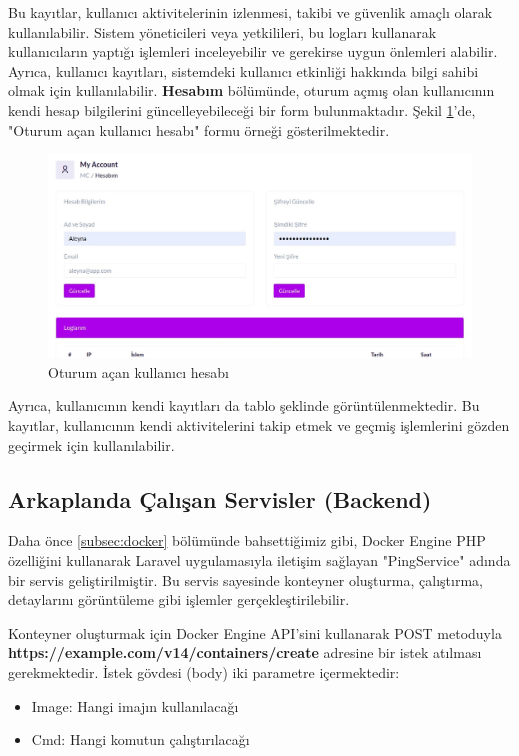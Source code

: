 Bu kayıtlar, kullanıcı aktivitelerinin izlenmesi, takibi ve güvenlik amaçlı olarak kullanılabilir. Sistem yöneticileri veya yetkilileri, bu logları kullanarak kullanıcıların yaptığı işlemleri inceleyebilir ve gerekirse uygun önlemleri alabilir. Ayrıca, kullanıcı kayıtları, sistemdeki kullanıcı etkinliği hakkında bilgi sahibi olmak için kullanılabilir.
\textbf{Hesabım} bölümünde, oturum açmış olan kullanıcının kendi hesap bilgilerini güncelleyebileceği bir form bulunmaktadır. Şekil \ref{fig:account}'de, "Oturum açan kullanıcı hesabı" formu örneği gösterilmektedir.
\begin{figure}[ht]
	\centering
	\includegraphics[width=0.7\linewidth]{images/account.jpeg}
	\caption{Oturum açan kullanıcı hesabı}
	\label{fig:account}
\end{figure}

Ayrıca, kullanıcının kendi kayıtları da tablo şeklinde görüntülenmektedir. Bu kayıtlar, kullanıcının kendi aktivitelerini takip etmek ve geçmiş işlemlerini gözden geçirmek için kullanılabilir.

\subsection{Arkaplanda Çalışan Servisler (Backend)}

Daha önce \ref{subsec:docker} bölümünde bahsettiğimiz gibi, Docker Engine PHP özelliğini kullanarak Laravel uygulamasıyla iletişim sağlayan "PingService" adında bir servis geliştirilmiştir. Bu servis sayesinde konteyner oluşturma, çalıştırma, detaylarını görüntüleme gibi işlemler gerçekleştirilebilir.

Konteyner oluşturmak için Docker Engine API'sini kullanarak POST metoduyla \textbf{https://example.com/v14/containers/create}  adresine bir istek atılması gerekmektedir. İstek gövdesi (body) iki parametre içermektedir:
\begin{itemize}
	\item Image: Hangi imajın kullanılacağı
	\item Cmd: Hangi komutun çalıştırılacağı
\end{itemize}

